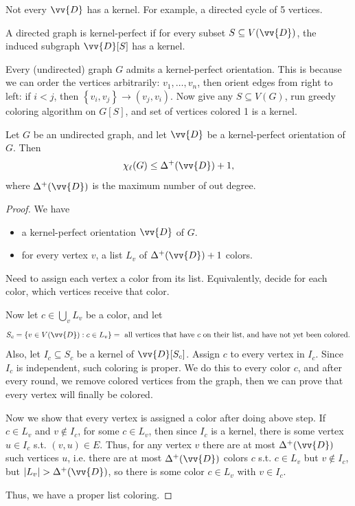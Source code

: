 \begin{remark}
    Not every \(\vv{D}\) has a kernel. For example, a directed cycle of 5 vertices. 
\end{remark}

\begin{definition}
    A directed graph is kernel-perfect if for every subset \(S \subseteq V(\vv{D})\), the induced subgraph \(\vv{D} [S]\) has a kernel.  
\end{definition}

\begin{observation}
    Every (undirected) graph \(G\) admits a kernel-perfect orientation. This is because we can order the vertices arbitrarily: \(v_1, \dots , v_n\), then orient edges from right to left: if \(i < j\), then \(\left\{ v_i, v_j \right\} \to (v_j, v_i)\). Now give any \(S \subseteq V(G)\), run greedy coloring algorithm on \(G[S]\), and set of vertices colored 1 is a kernel.     
\end{observation}

\begin{lemma}
    Let \(G\) be an undirected graph, and let \(\vv{D}\) be a kernel-perfect orientation of \(G\). Then 
    \[
        \chi _\ell (G) \le \Delta ^+ (\vv{D}) + 1,
    \]   
    where \(\Delta ^+(\vv{D})\) is the maximum number of out degree. 
\end{lemma}

\begin{proof}
    We have 
    \begin{itemize}
        \item a kernel-perfect orientation \(\vv{D}\) of \(G\). 
        \item for every vertex \(v\), a list \(L_v\) of \(\Delta ^+(\vv{D}) + 1\) colors.      
    \end{itemize}
    Need to assign each vertex a color from its list. Equivalently, decide for each color, which vertices receive that color. 

    Now let \(c \in \bigcup_{v} L_v \) be a color, and let 
    \[
        S_c = \left\{ v \in V(\vv{D}): c \in L_v \right\} = \text{ all vertices that have } c \text{ on their list, and have not yet been colored}.  
    \]  
    Also, let \(I_c \subseteq S_c\) be a kernel of \(\vv{D} [S_c]\). Assign \(c\) to every vertex in \(I_c\). Since \(I_c\) is independent, such coloring is proper. We do this to every color \(c\), and after every round, we remove colored vertices from the graph, then we can prove that every vertex will finally be colored.
    
    Now we show that every vertex is assigned a color after doing above step. If \(c \in L_v\) and \(v \notin I_c\), for some \(c \in L_v\), then since \(I_c\) is a kernel, there is some vertex \(u \in I_c\) s.t. \((v, u) \in E\). Thus, for any vertex \(v\) there are at most \(\Delta ^+ (\vv{D}) \) such vertices \(u\), i.e. there are at most \(\Delta ^+ (\vv{D})\) colors \(c\) s.t. \(c \in L_v\) but \(v \notin I_c\), but \(\vert L_v \vert > \Delta ^+(\vv{D}) \), so there is some color \(c \in L_v\) with \(v \in I_c\).

    Thus, we have a proper list coloring.              
\end{proof}